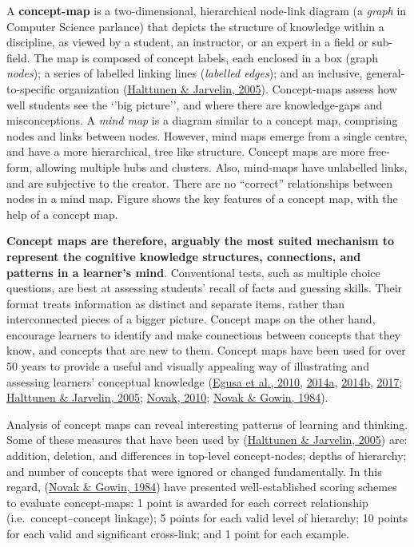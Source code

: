 \documentclass[letterpaper, nobind]{templates/ociamthesis}
\begin{document}
A \textbf{concept-map} is a two-dimensional, hierarchical node-link diagram
(a \emph{graph} in Computer Science parlance) that depicts the structure of
knowledge within a discipline, as viewed by a student, an instructor, or
an expert in a field or sub-field. The map is composed of concept
labels, each enclosed in a box (graph \emph{nodes}); a series of labelled
linking lines (\emph{labelled edges}); and an inclusive, general-to-specific
organization (\protect\hyperlink{ref-halttunen2005assessing}{Halttunen \& Jarvelin, 2005}). Concept-maps assess how well
students see the `'big picture'', and where there are knowledge-gaps and
misconceptions. A \emph{mind map} is a diagram similar to a concept map,
comprising nodes and links between nodes. However, mind maps emerge from
a single centre, and have a more hierarchical, tree like structure.
Concept maps are more free-form, allowing multiple hubs and clusters.
Also, mind-maps have unlabelled links, and are subjective to the
creator. There are no ``correct'' relationships between nodes in a mind
map. Figure
shows the key features of a concept
map, with the help of a concept map.

\textbf{Concept maps are therefore, arguably the most suited mechanism to
represent the cognitive knowledge structures, connections, and patterns
in a learner's mind}. Conventional tests, such as multiple choice
questions, are best at assessing students' recall of facts and guessing
skills. Their format treats information as distinct and separate items,
rather than interconnected pieces of a bigger picture. Concept maps on
the other hand, encourage learners to identify and make connections
between concepts that they know, and concepts that are new to them.
Concept maps have been used for over 50 years to provide a useful and
visually appealing way of illustrating and assessing learners'
conceptual knowledge
(\protect\hyperlink{ref-egusa2010usingb}{Egusa et al., 2010}, \protect\hyperlink{ref-egusa2014howd}{2014a}, \protect\hyperlink{ref-egusa2014howe}{2014b}, \protect\hyperlink{ref-egusa2017evaluating}{2017}; \protect\hyperlink{ref-halttunen2005assessing}{Halttunen \& Jarvelin, 2005}; \protect\hyperlink{ref-novak2010learninga}{Novak, 2010}; \protect\hyperlink{ref-novak1984learning}{Novak \& Gowin, 1984}).

Analysis of concept maps can reveal interesting patterns of learning and
thinking. Some of these measures that have been used by
(\protect\hyperlink{ref-halttunen2005assessing}{Halttunen \& Jarvelin, 2005}) are: addition, deletion, and differences in
top-level concept-nodes; depths of hierarchy; and number of concepts
that were ignored or changed fundamentally. In this regard,
(\protect\hyperlink{ref-novak1984learning}{Novak \& Gowin, 1984}) have presented well-established scoring schemes to
evaluate concept-maps: 1 point is awarded for each correct relationship
(i.e.~concept--concept linkage); 5 points for each valid level of
hierarchy; 10 points for each valid and significant cross-link; and 1
point for each example.
\end{document}
